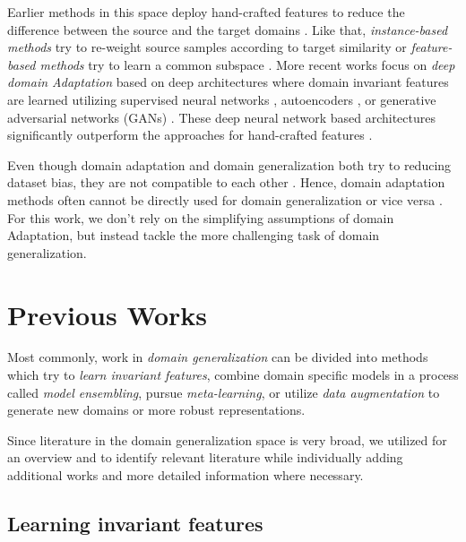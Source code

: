 Earlier methods in this space deploy hand-crafted features to reduce the difference between the source and the target domains \citep{ManciniPBC018}. Like that, \emph{instance-based methods} try to re-weight source samples according to target similarity \citep{GongGS13, HuangSGBS06, YamadaSR12} or \emph{feature-based methods} try to learn a common subspace \citep{FernandoHST13, GongSSG12, LongD0SGY13, BaktashmotlaghHLS13}. More recent works focus on \emph{deep domain Adaptation} based on deep architectures where domain invariant features are learned utilizing supervised neural networks \citep{BousmalisTSKE16, CarlucciPCRB17, GaninL15, GhifaryKZBL16}, autoencoders \citep{ZengOWW14}, or generative adversarial networks (GANs) \citep{BousmalisSDEK17, ShrivastavaPTSW17, TzengHSD17}. These deep neural network based architectures significantly outperform the approaches for hand-crafted features \citep{ManciniPBC018}.

Even though domain adaptation and domain generalization both try to reducing dataset bias, they are not compatible to each other \citep{GhifaryBKZ17}. Hence, domain adaptation methods often cannot be directly used for domain generalization or vice versa \citep{GhifaryBKZ17}. For this work, we don't rely on the simplifying assumptions of domain Adaptation, but instead tackle the more challenging task of domain generalization.

\section{Previous Works}

Most commonly, work in \emph{domain generalization} can be divided into methods which try to \emph{learn invariant features}, combine domain specific models in a process called \emph{model ensembling}, pursue \emph{meta-learning}, or utilize \emph{data augmentation} to generate new domains or more robust representations.

Since literature in the domain generalization space is very broad, we utilized \citet[Appendix A]{gulrajani2020search} for an overview and to identify relevant literature while individually adding additional works and more detailed information where necessary.  

\subsection{Learning invariant features}
\label{sec:invariant_features}

